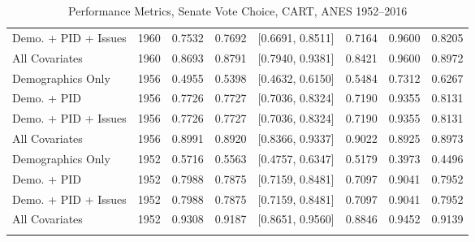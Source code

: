 \begin{longtable}{lrrrlrrr}
  Demo. + PID + Issues & 1960 & 0.7532 & 0.7692 & [0.6691, 0.8511] & 0.7164 & 0.9600 & 0.8205 \\ 
  All Covariates & 1960 & 0.8693 & 0.8791 & [0.7940, 0.9381] & 0.8421 & 0.9600 & 0.8972 \\ 
  Demographics Only & 1956 & 0.4955 & 0.5398 & [0.4632, 0.6150] & 0.5484 & 0.7312 & 0.6267 \\ 
  Demo. + PID & 1956 & 0.7726 & 0.7727 & [0.7036, 0.8324] & 0.7190 & 0.9355 & 0.8131 \\ 
  Demo. + PID + Issues & 1956 & 0.7726 & 0.7727 & [0.7036, 0.8324] & 0.7190 & 0.9355 & 0.8131 \\ 
  All Covariates & 1956 & 0.8991 & 0.8920 & [0.8366, 0.9337] & 0.9022 & 0.8925 & 0.8973 \\ 
  Demographics Only & 1952 & 0.5716 & 0.5563 & [0.4757, 0.6347] & 0.5179 & 0.3973 & 0.4496 \\ 
  Demo. + PID & 1952 & 0.7988 & 0.7875 & [0.7159, 0.8481] & 0.7097 & 0.9041 & 0.7952 \\ 
  Demo. + PID + Issues & 1952 & 0.7988 & 0.7875 & [0.7159, 0.8481] & 0.7097 & 0.9041 & 0.7952 \\ 
  All Covariates & 1952 & 0.9308 & 0.9187 & [0.8651, 0.9560] & 0.8846 & 0.9452 & 0.9139 \\ 
   \bottomrule
\caption{Performance Metrics, Senate Vote Choice, CART, ANES 1952--2016} 
\label{tab:ANES_senate_cart}
\end{longtable}
